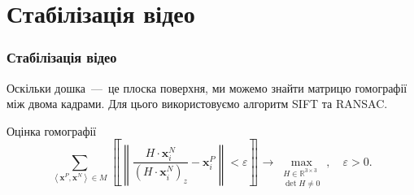 \section{Стабілізація відео}
\begin{frame}
  \frametitle{Стабілізація відео}

  Оскільки дошка~---~це плоска поверхня, ми можемо знайти матрицю гомографії між двома кадрами.
  Для цього використовуємо алгоритм SIFT та RANSAC.

  \begin{block}{Оцінка гомографії}
  \begin{equation*}
    \sum_{\left\langle \boldsymbol{x}^P, \boldsymbol{x}^N \right\rangle \in M}
      \left\llbracket
        \left\lVert \frac{H \cdot \boldsymbol{x}_i^N}{\left( H \cdot \boldsymbol{x}_i^N \right)_z}
        - \boldsymbol{x}_i^P \right\rVert < \varepsilon
      \right\rrbracket
    \to \max\limits_{\substack{H \in \mathbb{R}^{3 \times 3} \\ \det{H} \neq 0}},
    \quad \varepsilon > 0.
  \end{equation*}
  \end{block}

\end{frame}
